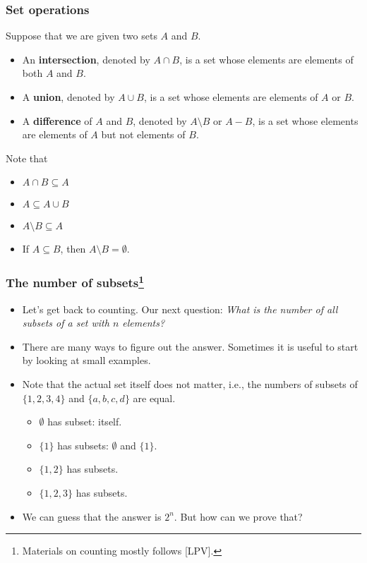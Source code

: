 \begin{frame}\frametitle{Set operations}
  Suppose that we are given two sets $A$ and $B$.
  \begin{itemize}
  \item An {\bf intersection}, denoted by $A\cap B$, is a set whose
    elements are elements of both $A$ and $B$.
  \item A {\bf union}, denoted by $A\cup B$, is a set whose elements
    are elements of $A$ or $B$.
  \item A {\bf difference} of $A$ and $B$, denoted by $A\setminus B$
    or $A-B$, is a set whose elements are elements of $A$ but not
    elements of $B$.
  \end{itemize}

  Note that
  \begin{itemize}
  \item $A\cap B\subseteq A$
  \item $A\subseteq A\cup B$
  \item $A\setminus B \subseteq A$
  \item If $A\subseteq B$, then $A\setminus B = \emptyset$.
  \end{itemize}
\end{frame}

\begin{frame}\frametitle{The number of subsets\footnote{Materials on counting mostly follows [LPV].}}
  \begin{itemize}
  \item Let's get back to counting.  Our next question: {\em What is the
    number of all subsets of a set with $n$ elements?}
    \pause
  \item There are many ways to figure out the answer.  Sometimes it is
    useful to start by looking at small examples.
    \pause
  \item Note that the actual set itself does not matter, i.e., the
    numbers of subsets of $\{1,2,3,4\}$ and $\{a,b,c,d\}$ are equal.
    \begin{itemize}
    \item $\emptyset$ has  subset: itself.
    \item $\{1\}$ has  subsets: $\emptyset$ and $\{1\}$.
    \item $\{1,2\}$ has  subsets.
    \item $\{1,2,3\}$ has  subsets.
    \end{itemize}
    \pause
  \item We can guess that the answer is $2^n$.  But how can we prove
    that?
  \end{itemize}
\end{frame}

